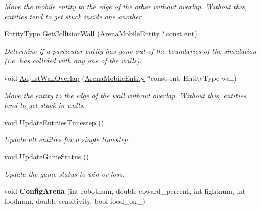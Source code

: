\begin{DoxyCompactItemize}
\begin{DoxyCompactList}\small\item\em Move the mobile entity to the edge of the other without overlap. Without this, entities tend to get stuck inside one another. \end{DoxyCompactList}\item 
Entity\+Type \mbox{\hyperlink{class_arena_a7b72cf7688ee6ab1395bf438663bc1da}{Get\+Collision\+Wall}} (\mbox{\hyperlink{class_arena_mobile_entity}{Arena\+Mobile\+Entity}} $\ast$const ent)
\begin{DoxyCompactList}\small\item\em Determine if a particular entity has gone out of the boundaries of the simulation (i.\+e. has collided with any one of the walls). \end{DoxyCompactList}\item 
\mbox{\label{class_arena_a51c1e99dfd9a618c6041fd22d0a11959}} 
void \mbox{\hyperlink{class_arena_a51c1e99dfd9a618c6041fd22d0a11959}{Adjust\+Wall\+Overlap}} (\mbox{\hyperlink{class_arena_mobile_entity}{Arena\+Mobile\+Entity}} $\ast$const ent, Entity\+Type wall)
\begin{DoxyCompactList}\small\item\em Move the entity to the edge of the wall without overlap. Without this, entities tend to get stuck in walls. \end{DoxyCompactList}\item 
void \mbox{\hyperlink{class_arena_a682ec81cb30e36e5bb801b3388bcb494}{Update\+Entities\+Timestep}} ()
\begin{DoxyCompactList}\small\item\em Update all entities for a single timestep. \end{DoxyCompactList}\item 
void \mbox{\hyperlink{class_arena_a700c436c43cd6c692b0e357dac94c507}{Update\+Game\+Status}} ()
\begin{DoxyCompactList}\small\item\em Update the game status to win or loss. \end{DoxyCompactList}\item 
\mbox{\label{class_arena_ad65f82d31e5d0fc7a859a809222fe53f}} 
void {\bfseries Config\+Arena} (int robotnum, double coward\+\_\+percent, int lightnum, int foodnum, double sensitivity, bool food\+\_\+on\+\_\+)
\item 
\mbox{\label{class_arena_a952408e8197790a034b75a4e275bcbc2}} 

\end{DoxyCompactItemize}
